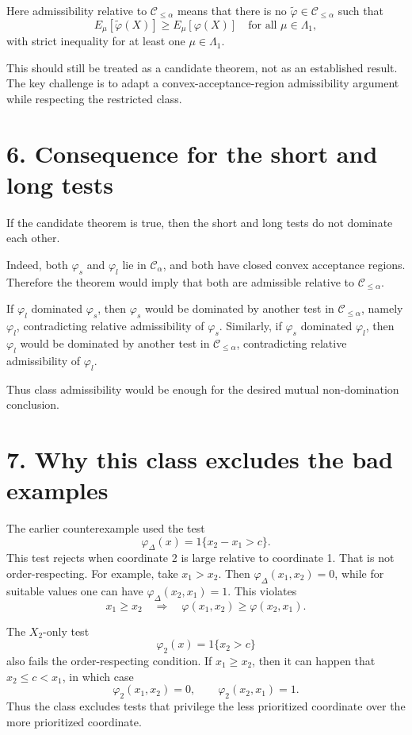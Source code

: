 \documentclass[11pt]{article}
\begin{document}
\medskip
Here admissibility relative to \(\mathcal C_{\le\alpha}\) means that there is no \(\widetilde\varphi\in\mathcal C_{\le\alpha}\) such that
\[
E_\mu[\widetilde\varphi(X)]
\ge
E_\mu[\varphi(X)]
\quad\text{for all }\mu\in\Lambda_1,
\]
with strict inequality for at least one \(\mu\in\Lambda_1\).

This should still be treated as a candidate theorem, not as an established result. The key challenge is to adapt a convex-acceptance-region admissibility argument while respecting the restricted class.

\section*{6. Consequence for the short and long tests}

If the candidate theorem is true, then the short and long tests do not dominate each other.

Indeed, both \(\varphi_s\) and \(\varphi_l\) lie in \(\mathcal C_\alpha\), and both have closed convex acceptance regions. Therefore the theorem would imply that both are admissible relative to \(\mathcal C_{\le\alpha}\).

If \(\varphi_l\) dominated \(\varphi_s\), then \(\varphi_s\) would be dominated by another test in \(\mathcal C_{\le\alpha}\), namely \(\varphi_l\), contradicting relative admissibility of \(\varphi_s\). Similarly, if \(\varphi_s\) dominated \(\varphi_l\), then \(\varphi_l\) would be dominated by another test in \(\mathcal C_{\le\alpha}\), contradicting relative admissibility of \(\varphi_l\).

Thus class admissibility would be enough for the desired mutual non-domination conclusion.

\section*{7. Why this class excludes the bad examples}

The earlier counterexample used the test
\[
\varphi_\Delta(x)=1\{x_2-x_1>c\}.
\]
This test rejects when coordinate 2 is large relative to coordinate 1. That is not order-respecting. For example, take \(x_1>x_2\). Then \(\varphi_\Delta(x_1,x_2)=0\), while for suitable values one can have \(\varphi_\Delta(x_2,x_1)=1\). This violates
\[
x_1\ge x_2
\quad\Longrightarrow\quad
\varphi(x_1,x_2)\ge\varphi(x_2,x_1).
\]

The \(X_2\)-only test
\[
\varphi_2(x)=1\{x_2>c\}
\]
also fails the order-respecting condition. If \(x_1\ge x_2\), then it can happen that \(x_2\le c<x_1\), in which case
\[
\varphi_2(x_1,x_2)=0,
\qquad
\varphi_2(x_2,x_1)=1.
\]
Thus the class excludes tests that privilege the less prioritized coordinate over the more prioritized coordinate.
\end{document}
